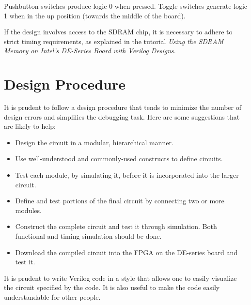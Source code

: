 \documentclass[11pt, twoside, pdftex]{article}
\newcommand{\commonPath}{../../../Common}
\begin{document}
Pushbutton switches produce logic 0 when pressed. Toggle switches
generate logic 1 when in the up position (towards the middle of the board).

If the design involves access to the SDRAM chip, it is necessary to adhere to
strict timing requirements, as explained in the tutorial
{\it Using the SDRAM Memory on Intel's DE-Series Board with Verilog Designs}.

\section{Design Procedure}
It is prudent to follow a design procedure that tends to minimize the number
of design errors and simplifies the debugging task. Here are some suggestions that 
are likely to help:
\begin{itemize}
\item Design the circuit in a modular, hierarchical manner.
\item Use well-understood and commonly-used constructs to define circuits.
\item Test each module, by simulating it, before it is incorporated into 
the larger circuit.
\item Define and test portions of the final circuit by connecting two or
more modules.
\item Construct the complete circuit and test it through simulation.
Both functional and timing simulation should be done.
\item Download the compiled circuit into the FPGA on the DE-series board and
test it.
\end{itemize}

It is prudent to write Verilog code in a style that allows one to easily
visualize the circuit specified by the code. It is also useful to make 
the code easily understandable for other people.   



\end{document}
